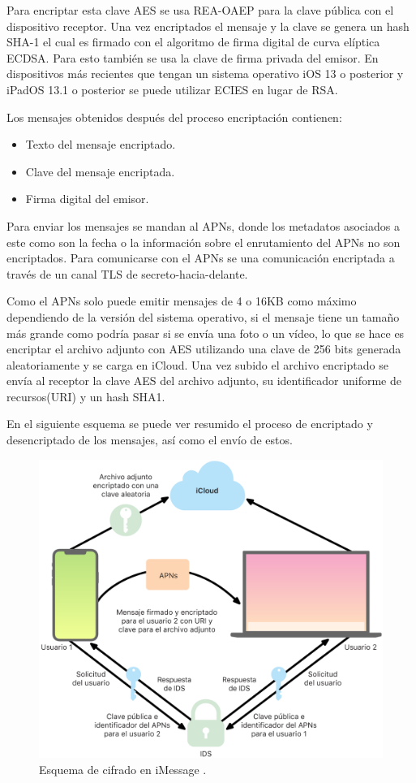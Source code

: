 Para encriptar esta clave AES se usa REA-OAEP para la clave pública con el dispositivo receptor. Una vez encriptados el mensaje y la clave se genera un hash SHA-1 el cual es firmado con el algoritmo de firma digital de curva elíptica ECDSA. Para esto también se usa la clave de firma privada del emisor. En dispositivos más recientes que tengan un sistema operativo iOS 13 o posterior y iPadOS 13.1 o posterior se puede utilizar ECIES en lugar de RSA.

Los mensajes obtenidos después del proceso encriptación contienen:
\begin{itemize}
	\item Texto del mensaje encriptado.
	\item Clave del mensaje encriptada.
	\item Firma digital del emisor.
\end{itemize}

Para enviar los mensajes se mandan al APNs, donde los metadatos asociados a este como son la fecha o la información sobre el enrutamiento del APNs no son encriptados. Para comunicarse con el APNs se una comunicación encriptada a través de un canal TLS de secreto-hacia-delante.

Como el APNs solo puede emitir mensajes de 4 o 16KB como máximo dependiendo de la versión del sistema operativo, si el mensaje tiene un tamaño más grande como podría pasar si se envía una foto o un vídeo, lo que se hace es encriptar el archivo adjunto con AES utilizando una clave de 256 bits generada aleatoriamente y se carga en iCloud. Una vez subido el archivo encriptado se envía al receptor la clave AES del archivo adjunto, su identificador uniforme de recursos(URI) y un hash SHA1.

En el siguiente esquema se puede ver resumido el proceso de encriptado y desencriptado de los mensajes, así como el envío de estos.
\begin{figure}[htb]
	\centering
	\includegraphics[scale=0.15]{imagenes/apple.png} 
	\caption{Esquema de cifrado en iMessage \cite{apple1}.}
	\label{iMessagefoto}
\end{figure}

